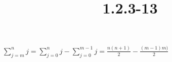 \documentclass{article}
\title{1.2.3-13}
\begin{document}
\maketitle

\( \sum_{j=m}^n j = \sum_{j=0}^n j - \sum_{j=0}^{m-1} j = \frac{n(n+1)}{2} - \frac{(m-1)m)}{2} \)
\end{document}
